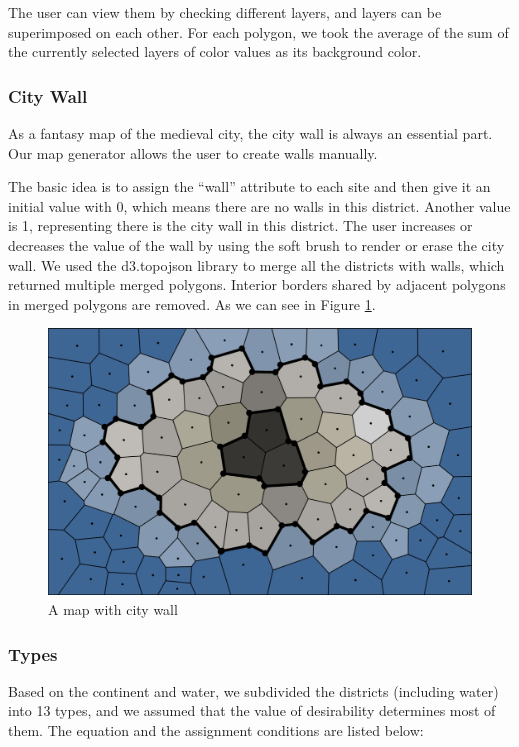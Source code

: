 The user can view them by checking different layers, and layers can be superimposed on each other. For each polygon, we took the average of the sum of the currently selected layers of color values as its background color.

\subsubsection{City Wall}
As a fantasy map of the medieval city, the city wall is always an essential part. Our map generator allows the user to create walls manually.

The basic idea is to assign the ``wall'' attribute to each site and then give it an initial value with 0, which means there are no walls in this district. Another value is 1, representing there is the city wall in this district. The user increases or decreases the value of the wall by using the soft brush to render or erase the city wall. We used the d3.topojson library to merge all the districts with walls, which returned multiple merged polygons. Interior borders shared by adjacent polygons in merged polygons are removed. As we can see in Figure \ref{fig:city wall}.

\begin{figure}[htbp]
  \includegraphics[width=\textwidth]{section04/assets/Map-wall.png}
  \caption{A map with city wall}
  \label{fig:city wall}
\end{figure}

\subsubsection{Types}
Based on the continent and water, we subdivided the districts (including water) into 13 types, and we assumed that the value of desirability determines most of them. The equation and the assignment conditions are listed below:

